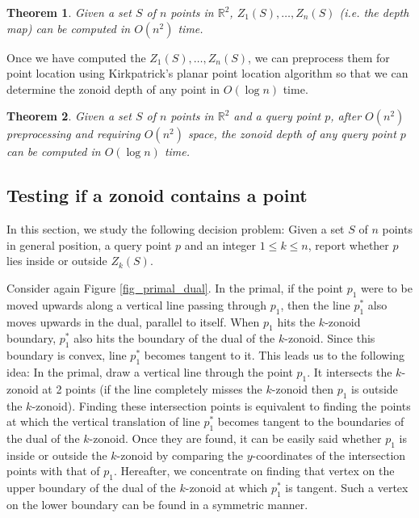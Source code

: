 \documentclass[charterfonts,lotsofwhite]{patmorin}
\newtheorem{theorem}{Theorem}
\begin{document}
\begin{theorem}\label{theorem_build_1_to_n_zonoids}
Given a set $S$ of $n$ points in $\mathbb{R}^2$,
$Z_1(S),\ldots,Z_n(S)$ (i.e. the depth map) can be computed in $O(n^2)$ time.
\end{theorem}

Once we have computed the $Z_1(S),\ldots,Z_n(S)$, we can preprocess them for point location using Kirkpatrick's planar point location algorithm \cite{optimal_search_in_planar_subdivisions} so that we can determine the zonoid depth of any point in $O(\log n)$ time. 

\begin{theorem}\label{theorem_point_location}
Given a set $S$ of $n$ points in $\mathbb{R}^2$ and a query point $p$,
after $O(n^2)$ preprocessing and requiring $O(n^2)$ space, the zonoid
depth of any query point $p$ can be computed in $O(\log n)$ time.
\end{theorem}

\subsection{Testing if a zonoid contains a point}\label{subsection_testing_if_a_zonoid_contains_a_point}

In this section, we study the following decision problem: Given a set
$S$ of $n$ points in general position, a query point $p$ and an
integer $1 \le k \le n$, report whether $p$ lies inside or outside
$Z_k(S)$. 

Consider again Figure \ref{fig_primal_dual}. In the primal, if the
point $p_1$ were to be moved upwards along a vertical line passing
through $p_1$, then the line $p_1^*$ also moves upwards in the dual,
parallel to itself. When $p_1$ hits the $k$-zonoid boundary, $p_1^*$
also hits the boundary of the dual of the $k$-zonoid. Since this
boundary is convex, line $p_1^*$ becomes tangent to it. This leads us
to the following idea: In the primal, draw a vertical line through the
point $p_1$. It intersects the $k$-zonoid at 2 points (if the line
completely misses the $k$-zonoid then $p_1$ is outside the
$k$-zonoid). Finding these intersection points is equivalent to
finding the points at which the vertical translation of line $p_1^*$
becomes tangent to the boundaries of the dual of the $k$-zonoid. Once
they are found, it can be easily said whether $p_1$ is inside or
outside the $k$-zonoid by comparing the $y$-coordinates of the
intersection points with that of  $p_1$.  Hereafter, we concentrate on
finding that vertex on the upper boundary of the dual of the
$k$-zonoid at which $p_1^*$ is tangent. Such a vertex on the lower
boundary can be found in a symmetric manner. 
\end{document}
